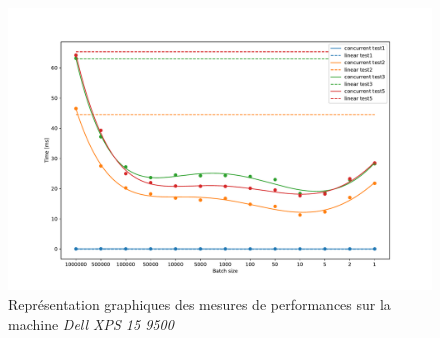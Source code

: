 \documentclass[
  french,
  a4paper,
]{scrartcl}
\begin{document}
  \begin{figure}[h]
    \centering
    \includegraphics[width=\textwidth]{assets/result-linux.pdf}
    \caption[Graphique des performances sur \textit{Dell XPS 15 9500}]{Représentation graphiques des mesures de performances sur la machine \textit{Dell XPS 15 9500}}
    \label{fig:result-linux}
  \end{figure}
\end{document}
